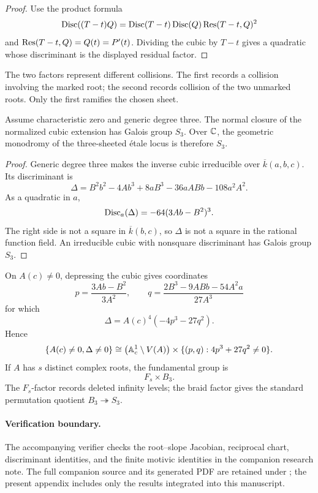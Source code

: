 \begin{proof}
Use the product formula
\[
\operatorname{Disc}((T-t)Q)=\operatorname{Disc}(T-t)\operatorname{Disc}(Q)\operatorname{Res}(T-t,Q)^2
\]
and \(\operatorname{Res}(T-t,Q)=Q(t)=P'(t)\).  Dividing the cubic by \(T-t\)
gives a quadratic whose discriminant is the displayed residual factor.
\end{proof}

The two factors represent different collisions.  The first records a
collision involving the marked root; the second records collision of the
two unmarked roots.  Only the first ramifies the chosen sheet.

\begin{theorem}
\label{thm:generic-S3}
Assume characteristic zero and generic degree three.  The normal closure of
the normalized cubic extension has Galois group \(S_3\).  Over \(\mathbb C\), the
geometric monodromy of the three-sheeted \'{e}tale locus is therefore
\(S_3\).
\end{theorem}

\begin{proof}
Generic degree three makes the inverse cubic irreducible over
\(\overline k(a,b,c)\).  Its discriminant is
\[
\Delta=B^2b^2-4Ab^3+8aB^3-36aABb-108a^2A^2.
\]
As a quadratic in \(a\),
\[
\operatorname{Disc}_a(\Delta)=-64(3Ab-B^2)^3.
\]
The right side is not a square in \(\overline k(b,c)\), so \(\Delta\) is
not a square in the rational function field.  An irreducible cubic with
nonsquare discriminant has Galois group \(S_3\).
\end{proof}

On \(A(c)\ne0\), depressing the cubic gives coordinates
\[
p=\frac{3Ab-B^2}{3A^2},\qquad
q=\frac{2B^3-9ABb-54A^2a}{27A^3}
\]
for which
\[
\Delta=A(c)^4(-4p^3-27q^2).
\]
Hence
\[
\{A(c)\ne0,\Delta\ne0\}
\cong
\bigl(\mathbb A^1_c\setminus V(A)\bigr)
\times
\{(p,q):4p^3+27q^2\ne0\}.
\]
If \(A\) has \(s\) distinct complex roots, the fundamental group is
\[
F_s\times B_3.
\]
The \(F_s\)-factor records deleted infinity levels; the braid factor gives
the standard permutation quotient \(B_3\twoheadrightarrow S_3\).

\paragraph{Verification boundary.}
The accompanying verifier checks the root--slope Jacobian, reciprocal
chart, discriminant identities, and the finite motivic identities in the
companion research note.  The full companion source and its generated PDF
are retained under ; the present appendix includes only
the results integrated into this manuscript.
